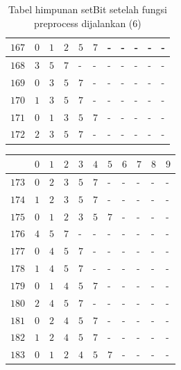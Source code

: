\begin{appendices}
\begin{table}[H]
\begin{tabular} {|l|l|l|l|l|l|l|l|l|l|l|}
  		$ 167 $ & $ 0 $ &$ 1 $ &$ 2 $ &$ 5 $ &$ 7 $ & - &  - &  - &  - &  -   \\ \hline
  		$ 168 $ & $ 3 $ &$ 5 $ &$ 7 $ & - &  - &  - &  - &  - &  - &  -   \\ \hline
  		$ 169 $ & $ 0 $ &$ 3 $ &$ 5 $ &$ 7 $ & - &  - &  - &  - &  - &  -   \\ \hline
  		$ 170 $ & $ 1 $ &$ 3 $ &$ 5 $ &$ 7 $ & - &  - &  - &  - &  - &  -   \\ \hline
  		$ 171 $ & $ 0 $ &$ 1 $ &$ 3 $ &$ 5 $ &$ 7 $ & - &  - &  - &  - &  -   \\ \hline
  		$ 172 $ & $ 2 $ &$ 3 $ &$ 5 $ &$ 7 $ & - &  - &  - &  - &  - &  -   \\ \hline  		
  	\end{tabular}\caption{Tabel himpunan setBit setelah fungsi preprocess dijalankan (6)}
  	\label{tab:setbit_6}
  \end{table}
  \begin{table}[H]
  	\centering
  	\begin{tabular} {|l|l|l|l|l|l|l|l|l|l|l|} \hline
  		\backslashbox{$Num$}{$index$} & $ 0 $ & $ 1 $ & $ 2 $ & $ 3 $ & $ 4 $ & $ 5 $ & $ 6 $ & $ 7 $ & $ 8 $ & $ 9 $ \\ \hline
  		$ 173 $ & $ 0 $ &$ 2 $ &$ 3 $ &$ 5 $ &$ 7 $ & - &  - &  - &  - &  -   \\ \hline
  		$ 174 $ & $ 1 $ &$ 2 $ &$ 3 $ &$ 5 $ &$ 7 $ & - &  - &  - &  - &  -   \\ \hline
  		$ 175 $ & $ 0 $ &$ 1 $ &$ 2 $ &$ 3 $ &$ 5 $ &$ 7 $ & - &  - &  - &  -   \\ \hline
  		$ 176 $ & $ 4 $ &$ 5 $ &$ 7 $ & - &  - &  - &  - &  - &  - &  -   \\ \hline
  		$ 177 $ & $ 0 $ &$ 4 $ &$ 5 $ &$ 7 $ & - &  - &  - &  - &  - &  -   \\ \hline
  		$ 178 $ & $ 1 $ &$ 4 $ &$ 5 $ &$ 7 $ & - &  - &  - &  - &  - &  -   \\ \hline
  		$ 179 $ & $ 0 $ &$ 1 $ &$ 4 $ &$ 5 $ &$ 7 $ & - &  - &  - &  - &  -   \\ \hline
  		$ 180 $ & $ 2 $ &$ 4 $ &$ 5 $ &$ 7 $ & - &  - &  - &  - &  - &  -   \\ \hline
  		$ 181 $ & $ 0 $ &$ 2 $ &$ 4 $ &$ 5 $ &$ 7 $ & - &  - &  - &  - &  -   \\ \hline
  		$ 182 $ & $ 1 $ &$ 2 $ &$ 4 $ &$ 5 $ &$ 7 $ & - &  - &  - &  - &  -   \\ \hline
  		$ 183 $ & $ 0 $ &$ 1 $ &$ 2 $ &$ 4 $ &$ 5 $ &$ 7 $ & - &  - &  - &  -   \\ \hline

\end{tabular}
\end{table}
\end{appendices}
